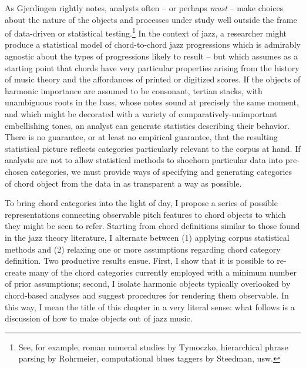 As Gjerdingen rightly notes, analysts often -- or perhaps \emph{must} -- make choices about the nature of the objects and processes under study well outside the frame of data-driven or statistical testing.\footnote{See, for example, roman numeral studies by Tymoczko, hierarchical phrase parsing by Rohrmeier, computational blues taggers by Steedman, usw.}  In the context of jazz, a researcher might produce a statistical model of chord-to-chord jazz progressions which is admirably agnostic about the types of progressions likely to result -- but which assumes as a starting point that chords have very particular properties arising from the history of music theory and the affordances of printed or digitized scores.  If the objects of harmonic importance are assumed to be consonant, tertian stacks, with unambiguous roots in the bass, whose notes sound at precisely the same moment, and which might be decorated with a variety of comparatively-unimportant embellishing tones, an analyst can generate statistics describing their behavior.  There is no guarantee, or at least no empirical guarantee, that the resulting statistical picture reflects categories particularly relevant to the corpus at hand.  If analysts are not to allow statistical methods to shoehorn particular data into pre-chosen categories, we must provide ways of specifying and generating categories of chord object from the data in as transparent a way as possible.

To bring chord categories into the light of day, I propose a series of possible representations connecting observable pitch features to chord objects to which they might be seen to refer.  Starting from chord definitions similar to those found in the jazz theory literature, I alternate between (1) applying corpus statistical methods and (2) relaxing one or more assumptions regarding chord category definition.  Two productive results ensue.  First, I show that it is possible to re-create many of the chord categories currently employed with a minimum number of prior assumptions; second, I isolate harmonic objects typically overlooked by chord-based analyses and suggest procedures for rendering them observable.  In this way, I mean the title of this chapter in a very literal sense: what follows is a discussion of how to make objects out of jazz music.

